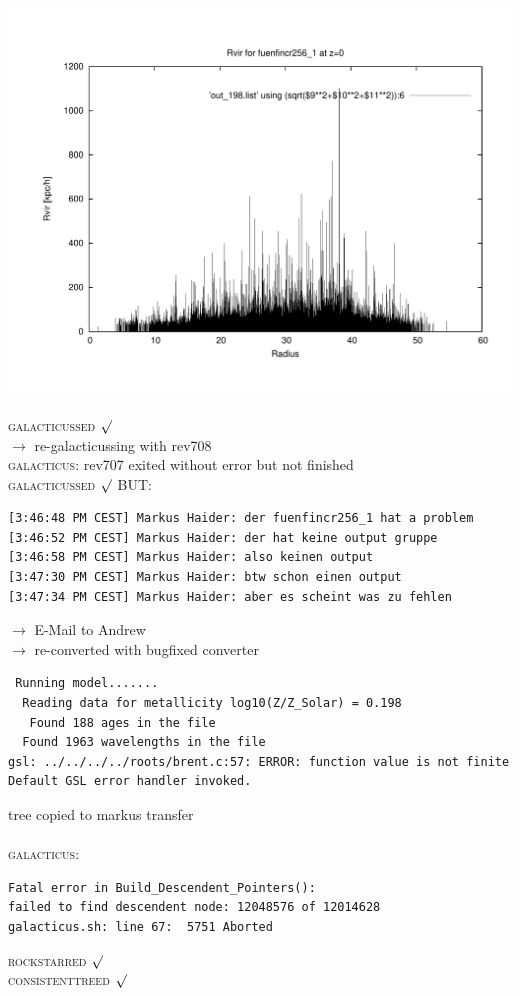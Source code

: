 \includegraphics[scale=0.3]{fuenfincr256_1/plot_rvir_z0.pdf}

\textsc{galacticussed} $\surd$ \\
$\rightarrow$ re-galacticussing with rev708 \\
\textsc{galacticus:} rev707 exited without error but not finished \\
\textsc{galacticussed} $\surd$
BUT: 
\begin{verbatim}
[3:46:48 PM CEST] Markus Haider: der fuenfincr256_1 hat a problem
[3:46:52 PM CEST] Markus Haider: der hat keine output gruppe
[3:46:58 PM CEST] Markus Haider: also keinen output
[3:47:30 PM CEST] Markus Haider: btw schon einen output
[3:47:34 PM CEST] Markus Haider: aber es scheint was zu fehlen
\end{verbatim}
$\rightarrow$ E-Mail to Andrew \\
$\rightarrow$ re-converted with bugfixed converter \\
\begin{verbatim}
 Running model....... 
  Reading data for metallicity log10(Z/Z_Solar) = 0.198
   Found 188 ages in the file
  Found 1963 wavelengths in the file
gsl: ../../../../roots/brent.c:57: ERROR: function value is not finite
Default GSL error handler invoked.
\end{verbatim}
tree copied to markus transfer \\
\\ \textsc{galacticus}: 
\begin{verbatim}
Fatal error in Build_Descendent_Pointers():
failed to find descendent node: 12048576 of 12014628
galacticus.sh: line 67:  5751 Aborted  
\end{verbatim}
\textsc{rockstarred} $\surd$ \\ \textsc{consistenttreed} $\surd$

